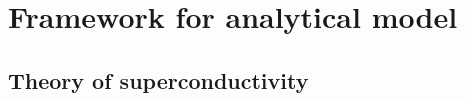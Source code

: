 \chapter{Framework for analytical model}
\label{ch:basics}

\section{Theory of superconductivity}





